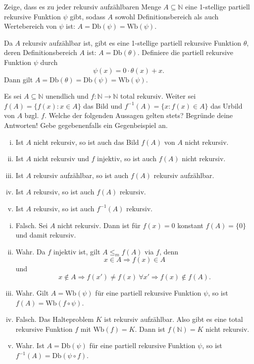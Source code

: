 \documentclass[german,headsepline]{scrartcl}
\begin{document}
	\begin{question}[subtitle={Klausur 2009}]
		Zeige, dass es zu jeder rekursiv aufzählbaren Menge $A\subseteq\mathbb{N}$ eine 1-stellige partiell rekursive Funktion $\psi$ gibt,
		sodass $A$ sowohl Definitionsbereich als auch Wertebereich von $\psi$ ist: $A=\text{Db}(\psi)=\text{Wb}(\psi)$.
	\end{question}
	\begin{solution}
		Da $A$ rekursiv aufzählbar ist, gibt es eine 1-stellige partiell rekursive Funktion $\theta$,
		deren Definitionsbereich $A$ ist: $A=\text{Db}(\theta)$.
		Definiere die partiell rekursive Funktion $\psi$ durch
		\[\psi(x)=0\cdot\theta(x)+x.\]
		Dann gilt $A=\text{Db}(\theta)=\text{Db}(\psi)=\text{Wb}(\psi)$.
	\end{solution}
	
	\begin{question}[subtitle={Klausur 2009}]
		Es sei $A\subseteq\mathbb{N}$ unendlich und $f:\mathbb{N}\to\mathbb{N}$ total rekursiv.
		Weiter sei $f(A)=\{f(x)\colon x\in A\}$ das Bild und $f^{-1}(A)=\{x\colon f(x)\in A\}$ das Urbild von $A$ bzgl. $f$.
		Welche der folgenden Aussagen gelten stets?
		Begründe deine Antworten! Gebe gegebenenfalls ein Gegenbeispiel an.
		\begin{enumerate}[(i)]
			\item Ist $A$ nicht rekursiv, so ist auch das Bild $f(A)$ von $A$ nicht rekursiv.
			\item Ist $A$ nicht rekursiv und $f$ injektiv, so ist auch $f(A)$ nicht rekursiv.
			\item Ist $A$ rekursiv aufzählbar, so ist auch $f(A)$ rekursiv aufzählbar.
			\item Ist $A$ rekursiv, so ist auch $f(A)$ rekursiv.
			\item Ist $A$ rekursiv, so ist auch $f^{-1}(A)$ rekursiv.
		\end{enumerate}
	\end{question}
	\begin{solution}
		\begin{enumerate}[(i)]
			\item Falsch. Sei $A$ nicht rekursiv. Dann ist für $f(x)=0$ konstant $f(A)=\{0\}$ und damit rekursiv.
			\item Wahr. Da $f$ injektiv ist, gilt $A\leq_mf(A)$ via $f$, denn
				\[x\in A\Rightarrow f(x)\in A\]
				und
				\[x\notin A\Rightarrow f(x')\neq f(x)~\forall x'\Rightarrow f(x)\notin f(A).\]
			\item Wahr. Gilt $A=\text{Wb}(\psi)$ für eine partiell rekursive Funktion $\psi$, so ist $f(A)=\text{Wb}(f\circ\psi)$.
			\item Falsch. Das Halteproblem $K$ ist rekursiv aufzählbar.
				Also gibt es eine total rekursive Funktion $f$ mit $\text{Wb}(f)=K$.
				Dann ist $f(\mathbb{N})=K$ nicht rekursiv.
			\item Wahr. Ist $A=\text{Db}(\psi)$ für eine partiell rekursive Funktion $\psi$, so ist $f^{-1}(A)=\text{Db}(\psi\circ f)$.
		\end{enumerate}
	\end{solution}
	
\end{document}
